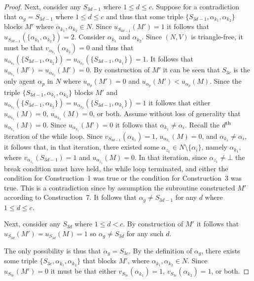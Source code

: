 \begin{proof}
Next, consider any $S_{3d-1}$ where $1\leq d \leq c$. Suppose for a contradiction that $\alpha_g = S_{3d-1}$ where $1\leq d \leq c$ and thus that some triple $\{ S_{3d-1}, \alpha_{k_1}, \alpha_{k_2} \}$ blocks $M'$ where $\alpha_{k_1}, \alpha_{k_2} \in N$. Since $u_{S_{3d-1}}(M')=1$ it follows that $u_{S_{3d-1}}(\{ \alpha_{k_1}, \alpha_{k_2} \})=2$. Consider $\alpha_{k_1}$ and $\alpha_{k_2}$. Since $(N, V)$ is triangle-free, it must be that $v_{\alpha_{k_1}}(\alpha_{k_2}) = 0$ and thus that $u_{\alpha_{k_1}}(\{ S_{3d-1}, \alpha_{k_2} \})=u_{\alpha_{k_2}}(\{ S_{3d-1}, \alpha_{k_1} \})=1$. It follows that $u_{\alpha_{k_1}}(M')=u_{\alpha_{k_2}}(M')=0$. By construction of $M'$ it can be seen that $S_{3c}$ is the only agent $\alpha_p$ in $N$ where $u_{\alpha_p}(M')=0$ and $u_{\alpha_p}(M') < u_{\alpha_p}(M)$. Since the triple $\{ S_{3d-1}, \alpha_{k_1}, \alpha_{k_2} \}$ blocks $M'$ and $u_{\alpha_{k_1}}(\{ S_{3d-1}, \alpha_{k_2} \})=u_{\alpha_{k_2}}(\{ S_{3d-1}, \alpha_{k_1} \})=1$ it follows that either $u_{\alpha_{k_1}}(M)=0$, $u_{\alpha_{k_2}}(M)=0$, or both. Assume without loss of generality that $u_{\alpha_{k_1}}(M)=0$. Since $u_{\alpha_{k_1}}(M')=0$ it follows that $\alpha_{k_1}\neq \alpha_i$. Recall the $d\textsuperscript{th}$ iteration of the while loop. Since $v_{S_{3d-1}}(\alpha_{k_1})=1$, $u_{\alpha_{k_1}}(M)=0$, and $\alpha_{k_1}\neq \alpha_i$, it follows that, in that iteration, there existed some $\alpha_{z_1} \in N\setminus \{\alpha_i\}$, namely $\alpha_{k_1}$, where $v_{\alpha_{z_1}}(S_{3d-1})=1$ and $u_{\alpha_{z_1}}(M)=0$. In that iteration, since $\alpha_{z_1} \neq \bot$ the break condition must have held, the while loop terminated, and either the condition for Construction~1 was true or the condition for Construction~3 was true. This is a contradiction since by assumption the subroutine constructed $M'$ according to Construction~7. It follows that $\alpha_g \neq S_{3d-1}$ for any $d$ where $1\leq d \leq c$. 

Next, consider any $S_{3d}$ where $1\leq d < c$. By construction of $M'$ it follows that $u_{S_{3d}}(M')=u_{S_{3d}}(M)=1$ so $\alpha_{g} \neq S_{3d}$ for any such $d$.

The only possibility is thus that $\alpha_g = S_{3c}$. By the definition of $\alpha_g$, there exists some triple $\{ S_{3c}, \alpha_{k_1}, \alpha_{k_2} \}$ that blocks $M'$, where $\alpha_{k_1}, \alpha_{k_2} \in N$. Since $u_{S_{3c}}(M')=0$ it must be that either $v_{S_{3c}}(\alpha_{k_1})=1$, $v_{S_{3c}}(\alpha_{k_2})=1$, or both.


\end{proof}
